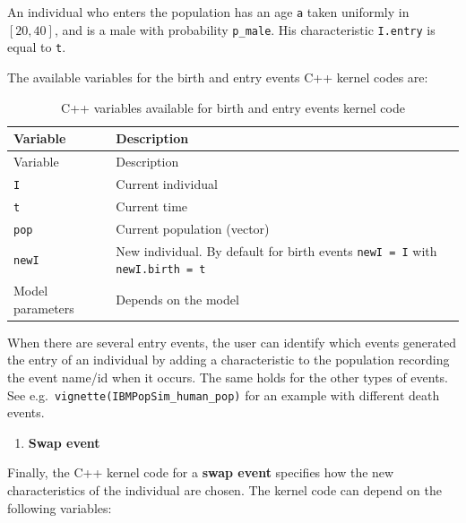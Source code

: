 \begin{Shaded}
\begin{Highlighting}[]
\OtherTok{\textless{}{-}} 
\end{Highlighting}
\end{Shaded}

An individual who enters the population has an age \texttt{a} taken uniformly in \([20,40]\), and is a male with probability \texttt{p\_male}. His characteristic \texttt{I.entry} is equal to \texttt{t}.

The available variables for the birth and entry events C++ kernel codes are:

\begin{longtable}[]{@{}ll@{}}
\caption{C++ variables available for birth and entry events kernel code}\tabularnewline
\toprule()
Variable & Description \\
\midrule()
\endfirsthead
\toprule()
Variable & Description \\
\midrule()
\endhead
\texttt{I} & Current individual \\
\texttt{t} & Current time \\
\texttt{pop} & Current population (vector) \\
\texttt{newI} & New individual. By default for birth events \texttt{newI\ =\ I} with \texttt{newI.birth\ =\ t} \\
Model parameters & Depends on the model \\
\bottomrule()
\end{longtable}

When there are several entry events, the user can identify which events generated the entry of an individual by adding a characteristic to the population recording the event name/id when it occurs. The same holds for the other types of events. See e.g.~\texttt{vignette(\textquotesingle{}IBMPopSim\_human\_pop\textquotesingle{})} for an example with different death events.

\begin{enumerate}
\def\labelenumi{\arabic{enumi}.}
\setcounter{enumi}{4}
\tightlist
\item
  \textbf{Swap event}
\end{enumerate}

Finally, the C++ kernel code for a \textbf{swap event} specifies how the new characteristics of the individual are chosen. The kernel code can depend on the following variables:

